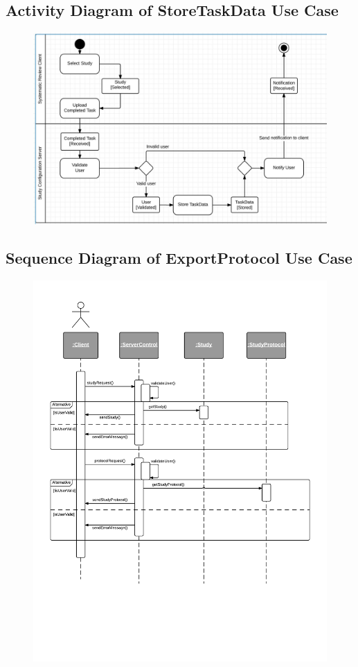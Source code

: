 \subsection{ Activity Diagram of StoreTaskData Use Case}
\begin{figure}[H]
  \includegraphics[width=45em]{section/DynamicModel/Activity_Diagram_StoreTaskData}
  \label{fig: Activity Diagram of StoreTaskData Use Casefail}
\end{figure}

\subsection{Sequence Diagram of ExportProtocol Use Case}
\begin{figure}[H]
  \includegraphics[width=45em]{section/DynamicModel/Sequence_Diagram_Export_Protocol}
  \label{fig:Sequence Diagram of ExportProtocol Use Case}
\end{figure}